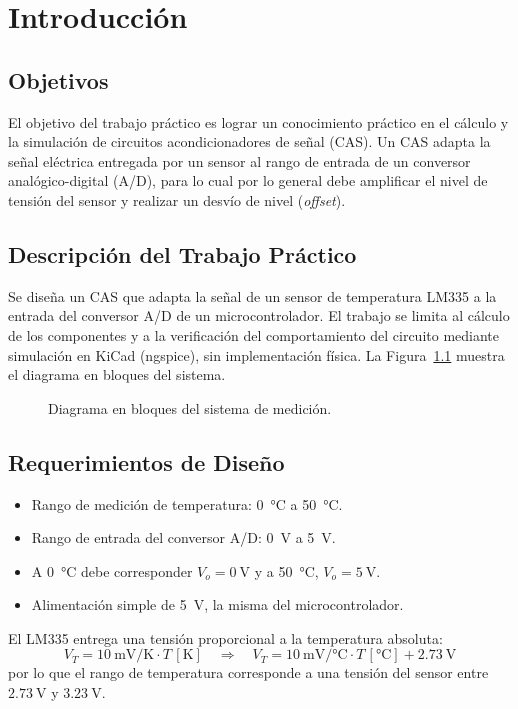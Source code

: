\chapter{Introducción}
\label{sec:introduccion}

\section{Objetivos}

El objetivo del trabajo práctico es lograr un conocimiento práctico en el cálculo y la simulación de circuitos
acondicionadores de señal (CAS). Un CAS adapta la señal eléctrica entregada por un sensor al rango de entrada de un
conversor analógico-digital (A/D), para lo cual por lo general debe amplificar el nivel de tensión del sensor y
realizar un desvío de nivel (\textit{offset}).

\section{Descripción del Trabajo Práctico}

Se diseña un CAS que adapta la señal de un sensor de temperatura LM335 a la entrada del conversor A/D de un
microcontrolador. El trabajo se limita al cálculo de los componentes y a la verificación del comportamiento del
circuito mediante simulación en KiCad (ngspice), sin implementación física. La Figura~\ref{fig:diagrama_bloques}
muestra el diagrama en bloques del sistema.

\begin{figure}[!ht]
  \centering
  
  \caption{Diagrama en bloques del sistema de medición.}
  \label{fig:diagrama_bloques}
\end{figure}

\section{Requerimientos de Diseño}

\begin{itemize}
  \item Rango de medición de temperatura: \SI{0}{\celsius} a \SI{50}{\celsius}.
  \item Rango de entrada del conversor A/D: \SI{0}{\volt} a \SI{5}{\volt}.
  \item A \SI{0}{\celsius} debe corresponder $V_o = \SI{0}{\volt}$ y a \SI{50}{\celsius}, $V_o = \SI{5}{\volt}$.
  \item Alimentación simple de \SI{5}{\volt}, la misma del microcontrolador.
\end{itemize}

El LM335 entrega una tensión proporcional a la temperatura absoluta:
\begin{equation}
  V_T = \SI{10}{\milli\volt/\kelvin} \cdot T\,[\unit{\kelvin}]
  \quad\Rightarrow\quad
  V_T = \SI{10}{\milli\volt/\celsius} \cdot T\,[\unit{\celsius}] + \SI{2.73}{\volt}
  \label{eq:sensor}
\end{equation}
por lo que el rango de temperatura corresponde a una tensión del sensor entre $\SI{2.73}{\volt}$ y
$\SI{3.23}{\volt}$.
